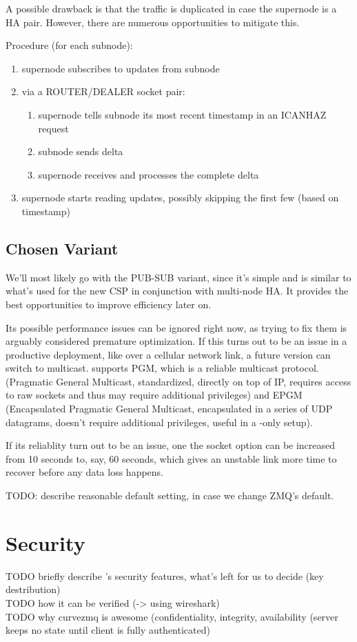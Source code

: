 A possible drawback is that the traffic is duplicated in case the supernode
is a HA pair. However, there are numerous opportunities to mitigate this.

Procedure (for each subnode):
\begin{enumerate}
	\item supernode subscribes to updates from subnode
	\item via a ROUTER/DEALER socket pair:
		\begin{enumerate}
			\item supernode tells subnode its most recent timestamp in an ICANHAZ request
			\item subnode sends delta
			\item supernode receives and processes the complete delta
		\end{enumerate}
	\item supernode starts reading updates, possibly skipping the first few (based on timestamp)
\end{enumerate}

\subsection{Chosen Variant}
We'll most likely go with the PUB-SUB variant, since it's simple and is similar to
what's used for the new CSP in conjunction with multi-node HA. It provides the best
opportunities to improve efficiency later on.

Its possible performance issues can be ignored right now, as trying to fix them
is arguably considered premature optimization. If this turns out to be an issue
in a productive deployment, like over a cellular network link, a future version
can switch to multicast. \zmq supports PGM, which is a reliable multicast
protocol. (Pragmatic General Multicast, standardized, directly on top of IP,
requires access to raw sockets and thus may require additional privileges) and
EPGM (Encapsulated Pragmatic General Multicast, encapsulated in a series of UDP
datagrams, doesn't require additional privileges, useful in a \zmq-only setup).

If its reliablity turn out to be an issue, one the socket option
 can be increased from 10 seconds to, say, 60 seconds, which
gives an unstable link more time to recover before any data loss happens.

TODO: describe reasonable default setting, in case we change ZMQ's default.


\section{Security}\label{sec:meth:security}
TODO briefly describe \zmq's security features, what's left for us to decide (key destribution)\\
TODO how it can be verified (-> using wireshark)\\
TODO why curvezmq is awesome (confidentiality, integrity, availability (server keeps no state until client is fully authenticated)




